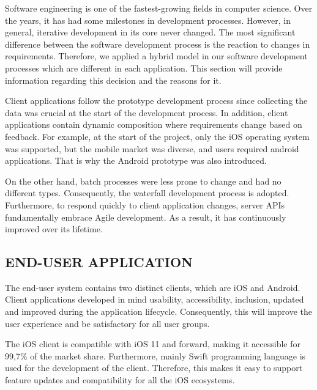 Software engineering is one of the fastest-growing fields in computer science. Over the years, it has had some milestones in development processes. However, in general, iterative development in its core never changed. The most significant difference between the software development process is the reaction to changes in requirements. Therefore, we applied a hybrid model in our software development processes which are different in each application. This section will provide information regarding this decision and the reasons for it.

Client applications follow the prototype development process since collecting the data was crucial at the start of the development process. In addition, client applications contain dynamic composition where requirements change based on feedback. For example, at the start of the project, only the iOS operating system was supported, but the mobile market was diverse, and users required android applications. That is why the Android prototype was also introduced.

On the other hand, batch processes were less prone to change and had no different types. Consequently, the waterfall development process is adopted. Furthermore, to respond quickly to client application changes, server APIs fundamentally embrace Agile development. As a result, it has continuously improved over its lifetime. 

\subsection{END-USER APPLICATION}

The end-user system contains two distinct clients, which are iOS and Android. Client applications developed in mind usability, accessibility, inclusion, updated and improved during the application lifecycle. Consequently, this will improve the user experience and be satisfactory for all user groups.

The iOS client is compatible with iOS 11 and forward, making it accessible for 99,7\% of the market share. Furthermore, mainly Swift programming language is used for the development of the client. Therefore, this makes it easy to support feature updates and compatibility for all the iOS ecosystems. 

